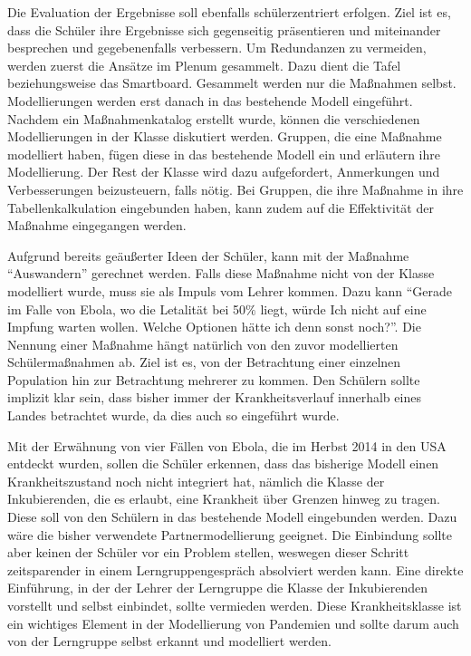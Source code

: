 Die Evaluation der Ergebnisse soll ebenfalls schülerzentriert erfolgen. Ziel ist es, dass die Schüler ihre Ergebnisse sich gegenseitig präsentieren und miteinander besprechen und gegebenenfalls verbessern. Um Redundanzen zu vermeiden, werden zuerst die Ansätze im Plenum gesammelt. Dazu dient die Tafel beziehungsweise das Smartboard. Gesammelt werden nur die Maßnahmen selbst. Modellierungen werden erst danach in das bestehende Modell eingeführt. Nachdem ein Maßnahmenkatalog erstellt wurde, können die verschiedenen Modellierungen in der Klasse diskutiert werden. Gruppen, die eine Maßnahme modelliert haben, fügen diese in das bestehende Modell ein und erläutern ihre Modellierung. Der Rest der Klasse wird dazu aufgefordert, Anmerkungen und Verbesserungen beizusteuern, falls nötig. Bei Gruppen, die ihre Maßnahme in ihre Tabellenkalkulation eingebunden haben, kann zudem auf die Effektivität der Maßnahme eingegangen werden. 

Aufgrund bereits geäußerter Ideen der Schüler, kann mit der Maßnahme ``Auswandern'' gerechnet werden. Falls diese Maßnahme nicht von der Klasse modelliert wurde, muss sie als Impuls vom Lehrer kommen. Dazu kann ``Gerade im Falle von Ebola, wo die Letalität bei 50$\%$ liegt, würde Ich nicht auf eine Impfung warten wollen. Welche Optionen hätte ich denn sonst noch?''. Die Nennung einer Maßnahme hängt natürlich von den zuvor modellierten Schülermaßnahmen ab. Ziel ist es, von der Betrachtung einer einzelnen Population hin zur Betrachtung mehrerer zu kommen. Den Schülern sollte implizit klar sein, dass bisher immer der Krankheitsverlauf innerhalb eines Landes betrachtet wurde, da dies auch so eingeführt wurde.

Mit der Erwähnung von vier Fällen von Ebola, die im Herbst 2014 in den USA entdeckt wurden, sollen die Schüler erkennen, dass das bisherige Modell einen Krankheitszustand noch nicht integriert hat, nämlich die Klasse der Inkubierenden, die es erlaubt, eine Krankheit über Grenzen hinweg zu tragen. Diese soll von den Schülern in das bestehende Modell eingebunden werden. Dazu wäre die bisher verwendete Partnermodellierung geeignet. Die Einbindung sollte aber keinen der Schüler vor ein Problem stellen, weswegen dieser Schritt zeitsparender in einem Lerngruppengespräch absolviert werden kann. Eine direkte Einführung, in der der Lehrer der Lerngruppe die Klasse der Inkubierenden vorstellt und selbst einbindet, sollte vermieden werden. Diese Krankheitsklasse ist ein wichtiges Element in der Modellierung von Pandemien und sollte darum auch von der Lerngruppe selbst erkannt und modelliert werden. 

